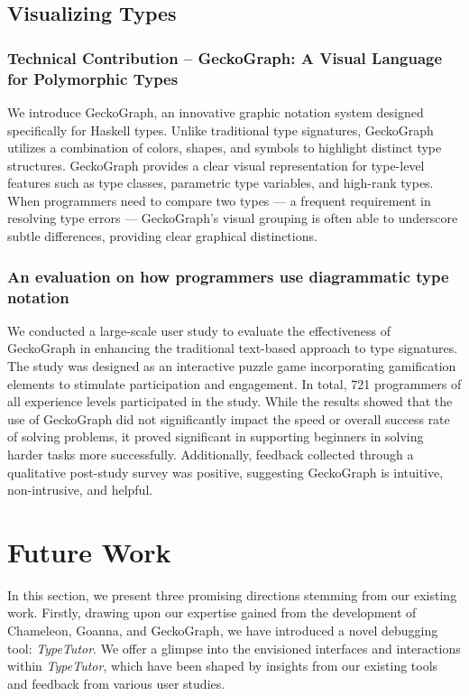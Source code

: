 \subsection{Visualizing Types}

\subsubsection{Technical Contribution -- GeckoGraph: A Visual Language for Polymorphic Types}

We introduce GeckoGraph, an innovative graphic notation system designed specifically for Haskell types. Unlike traditional type signatures, GeckoGraph utilizes a combination of colors, shapes, and symbols to highlight distinct type structures. GeckoGraph provides a clear visual representation for type-level features such as type classes, parametric type variables, and high-rank types. When programmers need to compare two types — a frequent requirement in resolving type errors — GeckoGraph's visual grouping is often able to underscore subtle differences, providing clear graphical distinctions.

\subsubsection{An evaluation on how programmers use diagrammatic type notation}

We conducted a large-scale user study to evaluate the effectiveness of GeckoGraph in enhancing the traditional text-based approach to type signatures. The study was designed as an interactive puzzle game incorporating gamification elements to stimulate participation and engagement. In total,  721 programmers of all experience levels participated in the study. While the results showed that the use of GeckoGraph did not significantly impact the speed or overall success rate of solving problems, it proved significant in supporting beginners in solving harder tasks more successfully. Additionally, feedback collected through a qualitative post-study survey was positive, suggesting GeckoGraph is intuitive, non-intrusive, and helpful.

\section{Future Work}

In this section, we present three promising directions stemming from our existing work. Firstly, drawing upon our expertise gained from the development of Chameleon, Goanna, and GeckoGraph, we have introduced a novel debugging tool: \textit{TypeTutor}. We offer a glimpse into the envisioned interfaces and interactions within \textit{TypeTutor}, which have been shaped by insights from our existing tools and feedback from various user studies.

